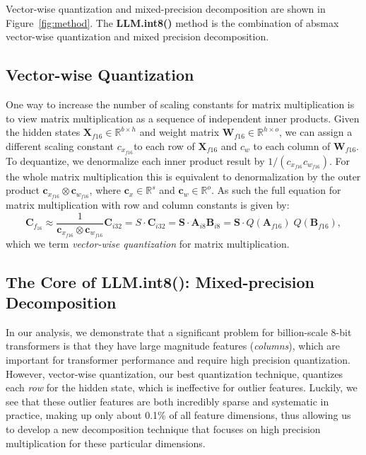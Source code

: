 \documentclass{article}
\begin{document}
Vector-wise quantization and mixed-precision decomposition are shown in Figure~\ref{fig:method}. The {\bf LLM.int8()} method is the combination of absmax vector-wise quantization and mixed precision decomposition. 

\subsection{Vector-wise Quantization}

One way to increase the number of scaling constants for matrix multiplication is to view matrix multiplication as a sequence of independent inner products. Given the hidden states $\mathbf{X}_{f16}\in \mathbb{R}^{b\times h}$ and weight matrix $\mathbf{W}_{f16}\in \mathbb{R}^{h\times o}$, we can assign a different scaling constant $c_{x_{f16}}$to each row of $\mathbf{X}_{f16}$ and $c_w$ to each column of $\mathbf{W}_{f16}$. To dequantize, we denormalize each inner product result by $1/(c_{x_{f16}}c_{w_{f16}})$. For the whole matrix multiplication this is equivalent to denormalization by the outer product $\mathbf{c}_{x_{f16}} \otimes \mathbf{c}_{w_{f16}}$, where $\mathbf{c}_x \in \mathbb{R}^s$ and $\mathbf{c}_w \in \mathbb{R}^o$. As such the full equation for matrix multiplication with row and column constants is given by:
\begin{equation}
    \mathbf{C}_{f_{16}} \approx \frac{1}{\mathbf{c}_{x_{f16}}\otimes \mathbf{c}_{w_{f16}}} \mathbf{C}_{i32} = S\cdot\mathbf{C}_{i32}= \mathbf{S}\cdot\mathbf{A}_{i8}\mathbf{B}_{i8} = \mathbf{S}\cdot Q(\mathbf{A}_{f16})\phantom{.} Q(\mathbf{B}_{f16}),
\end{equation}
which we term {\it vector-wise quantization} for matrix multiplication.

\subsection{The Core of LLM.int8(): Mixed-precision Decomposition}

In our analysis, we demonstrate that a significant problem for billion-scale 8-bit transformers is that they have large magnitude features ({\it columns}), which are important for transformer performance and require high precision quantization. However, vector-wise quantization, our best quantization technique, quantizes each {\it row} for the hidden state, which is ineffective for outlier features. Luckily, we see that these outlier features are both incredibly sparse and systematic in practice, making up only about 0.1\% of all feature dimensions, thus allowing us to develop a new decomposition technique that focuses on high precision multiplication for these particular dimensions.
\end{document}
